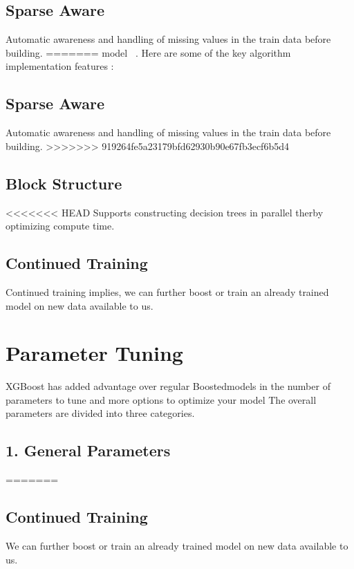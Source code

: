 \subsection{Sparse Aware} 

Automatic awareness and handling of missing values in the train data before 
building.
=======
model ~\cite{hid-sp18-401-XGBoost-MLmastery}. Here are some of the key algorithm 
implementation features :

\subsection{Sparse Aware} 
Automatic awareness and handling of missing values in the train data before building.
>>>>>>> 919264fe5a23179bfd62930b90e67fb3ecf6b5d4

\subsection{Block Structure}

<<<<<<< HEAD
Supports constructing decision trees in parallel therby optimizing compute time.

\subsection{Continued Training} 

Continued training implies, we can further boost or train an already trained
model on new data available to us.



\section{Parameter Tuning} 

XGBoost has added advantage over regular Boostedmodels in the number of
parameters  to tune and more options to optimize your model The overall
parameters are divided  into three categories.

\subsection{1. General Parameters}
=======
\subsection{Continued Training} 
We can further boost or train an already trained model on new data available to us.



